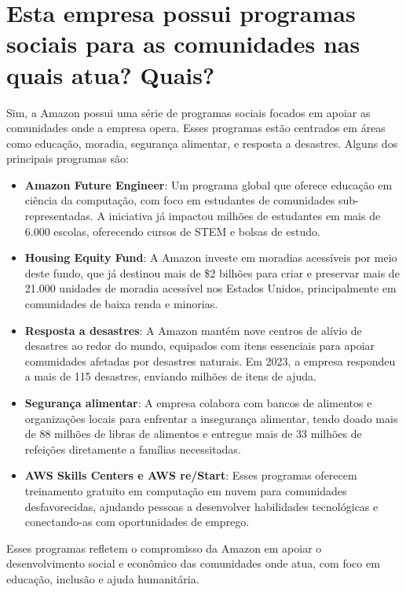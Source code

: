 \section{Esta empresa possui programas sociais para as comunidades nas quais atua? Quais?}

Sim, a Amazon possui uma série de programas sociais focados em apoiar as comunidades onde a empresa opera. Esses programas estão centrados em áreas como educação, moradia, segurança alimentar, e resposta a desastres. Alguns dos principais programas são:

\begin{itemize}
    \item \textbf{Amazon Future Engineer}: Um programa global que oferece educação em ciência da computação, com foco em estudantes de comunidades sub-representadas. A iniciativa já impactou milhões de estudantes em mais de 6.000 escolas, oferecendo cursos de STEM e bolsas de estudo.

    \item \textbf{Housing Equity Fund}: A Amazon investe em moradias acessíveis por meio deste fundo, que já destinou mais de \$2 bilhões para criar e preservar mais de 21.000 unidades de moradia acessível nos Estados Unidos, principalmente em comunidades de baixa renda e minorias.

    \item \textbf{Resposta a desastres}: A Amazon mantém nove centros de alívio de desastres ao redor do mundo, equipados com itens essenciais para apoiar comunidades afetadas por desastres naturais. Em 2023, a empresa respondeu a mais de 115 desastres, enviando milhões de itens de ajuda.

    \item \textbf{Segurança alimentar}: A empresa colabora com bancos de alimentos e organizações locais para enfrentar a insegurança alimentar, tendo doado mais de 88 milhões de libras de alimentos e entregue mais de 33 milhões de refeições diretamente a famílias necessitadas.

    \item \textbf{AWS Skills Centers e AWS re/Start}: Esses programas oferecem treinamento gratuito em computação em nuvem para comunidades desfavorecidas, ajudando pessoas a desenvolver habilidades tecnológicas e conectando-as com oportunidades de emprego.
\end{itemize}

Esses programas refletem o compromisso da Amazon em apoiar o desenvolvimento social e econômico das comunidades onde atua, com foco em educação, inclusão e ajuda humanitária.\cite{amazonSustainability}

